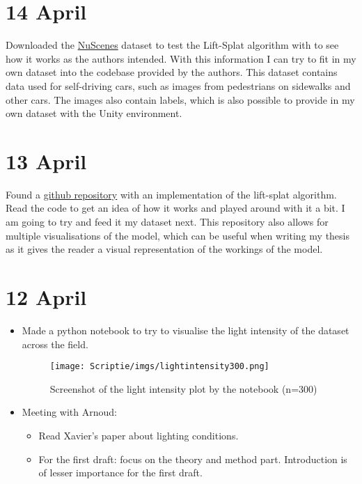 \documentclass[twoside]{report}
\begin{document}
\section*{14 April}
Downloaded the \href{https://www.nuscenes.org/nuscenes}{NuScenes} dataset to test the Lift-Splat algorithm with to see how it works as the authors intended. With this information I can try to fit in my own dataset into the codebase provided by the authors.
This dataset contains data used for self-driving cars, such as images from pedestrians on sidewalks and other cars. The images also contain labels, which is also possible to provide in my own dataset with the Unity environment.

\section*{13 April}
Found a \href{https://github.com/nv-tlabs/lift-splat-shoot}{github repository} with an implementation of the lift-splat algorithm. Read the code to get an idea of how it works and played around with it a bit. I am going to try and feed it my dataset next.
This repository also allows for multiple visualisations of the model, which can be useful when writing my thesis as it gives the reader a visual representation of the workings of the model.

\section*{12 April}
\begin{itemize}
    \item Made a python notebook to try to visualise the light intensity of the dataset across the field.
        \begin{figure}[!h]
        \begin{centering}
        \texttt{[image: Scriptie/imgs/lightintensity300.png]}
        \caption{Screenshot of the light intensity plot by the notebook (n=300)}
        \end{centering}
        \end{figure}

    \item Meeting with Arnoud: 
    \begin{itemize}
        \item Read Xavier's paper about lighting conditions.
        \item For the first draft: focus on the theory and method part. Introduction is of lesser importance for the first draft.
    \end{itemize}
\end{itemize}
\end{document}
